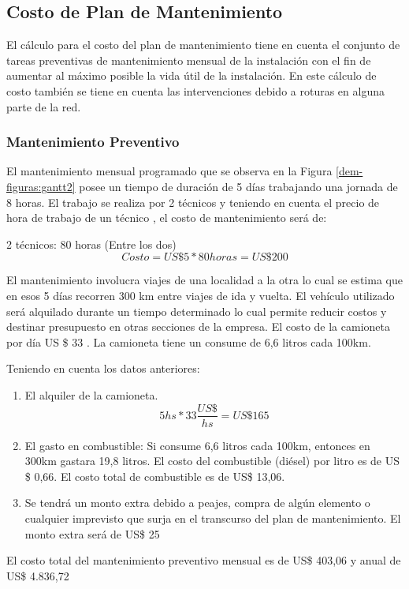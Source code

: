 \subsection{Costo de Plan de Mantenimiento}

El cálculo para el costo del plan de mantenimiento tiene en cuenta el conjunto de tareas preventivas de mantenimiento mensual de la instalación con el fin de aumentar al máximo posible la vida útil de la instalación. En este cálculo de costo también se tiene en cuenta las intervenciones debido a roturas en alguna parte de la red. 

\subsubsection{Mantenimiento Preventivo}

El mantenimiento mensual programado que se observa en la Figura \ref{dem-figuras:gantt2} posee un tiempo de duración de 5 días trabajando una jornada de 8 horas. El trabajo se realiza por 2 técnicos y teniendo en cuenta el precio de hora de trabajo de un técnico \cite{costo2tec}, el costo de mantenimiento será de:

2 técnicos: 80 horas (Entre los dos)
\begin{equation}
Costo= US\$5* 80 horas= US\$200
\end{equation}

El mantenimiento involucra viajes de una localidad a la otra lo cual se estima que en esos 5 días recorren 300 km  entre viajes de ida y vuelta. El vehículo utilizado será alquilado durante un tiempo determinado lo cual permite reducir costos y destinar presupuesto en otras secciones de la empresa. El costo de la camioneta por día US \$ 33 \cite{costo20}. La camioneta tiene un consume de 6,6 litros cada 100km. 

Teniendo en cuenta los datos anteriores:

%
%

\begin{enumerate}


\item El alquiler de la camioneta.
\begin{equation}
5hs*33\dfrac{US\$}{hs}=US\$ 165
\end{equation}


\item El gasto en combustible:
Si consume 6,6 litros cada 100km, entonces en 300km gastara 19,8 litros. El costo del combustible (diésel) por litro es de US \$ 0,66. El costo total de combustible es de US\$ 13,06.
\item Se tendrá un monto extra debido a peajes, compra de algún elemento o cualquier imprevisto que surja en el transcurso del plan de mantenimiento.  El monto extra será de US\$ 25
\end{enumerate}
%
El costo total del mantenimiento preventivo mensual es de US\$ 403,06 y anual de US\$ 4.836,72
%

